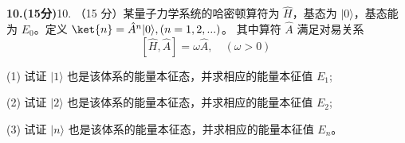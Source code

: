 \textbf{10.(15分)}10. （15 分）某量子力学系统的哈密顿算符为 $\hat{H}$，基态为 $|0\rangle$，基态能为 $E_0$。定义 
$\ket{n} = \hat{A}^n|0\rangle, (n=1,2,...)$。
其中算符 $\hat{A}$ 满足对易关系 
$$[\hat{H}, \hat{A}] = \omega \hat{A}, \quad (\omega > 0)~$$

(1) 试证 $|1\rangle$ 也是该体系的能量本征态，并求相应的能量本征值 $E_1$;

(2) 试证 $|2\rangle$ 也是该体系的能量本征态，并求相应的能量本征值 $E_2$;

(3) 试证 $|n\rangle$ 也是该体系的能量本征态，并求相应的能量本征值 $E_n$。
